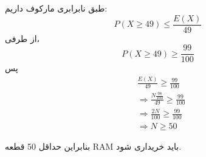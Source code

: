طبق نابرابری مارکوف داریم:
$$
P(X \ge 49) \le \frac{E(X)}{49}
$$
از طرفی،
$$
P(X \ge 49) \ge \frac{99}{100}
$$
پس
\begin{align*}
&\frac{E(X)}{49} \ge \frac{99}{100}\\
&\Rightarrow \frac{N\frac{98}{100}}{49} \ge \frac{99}{100} \\
&\Rightarrow \frac{2N}{100} \ge \frac{99}{100} \\
& \Rightarrow N \ge 50
\end{align*}

بنابراین حداقل 50 قطعه RAM باید خریداری شود.
